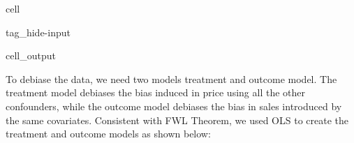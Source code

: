 \documentclass[letterpaper,10pt,english]{jupyterBook}
\begin{document}
\begin{sphinxuseclass}{cell}
\begin{sphinxuseclass}{tag_hide-input}\begin{sphinxVerbatimOutput}

\begin{sphinxuseclass}{cell_output}
\noindent{}

\end{sphinxuseclass}\end{sphinxVerbatimOutput}

\end{sphinxuseclass}
\end{sphinxuseclass}
\sphinxAtStartPar
To debiase the data, we need two models\sphinxhyphen{} treatment and outcome model. The treatment model debiases the bias induced in price using all the other confounders, while the outcome model debiases the bias in sales introduced by the same covariates. Consistent with FWL Theorem, we used OLS to create the treatment and outcome models as shown below:
\end{document}
